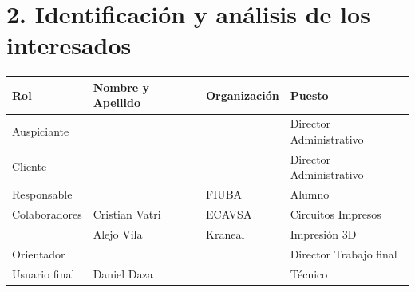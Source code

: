 \documentclass[
11pt, %
]{charter}
\begin{document}



\section{2. Identificación y análisis de los interesados}
\label{sec:interesados}


\begin{table}[ht]
\begin{tabularx}{\linewidth}{@{}|l|X|X|l|@{}}
\hline
\rowcolor[HTML]{C0C0C0} 
Rol           	& Nombre y Apellido & Organización 		& Puesto 					\\ \hline
Auspiciante   	& \clientename      & \empclientename  	& Director Administrativo    \\ \hline
Cliente       	& \clientename      & \empclientename	& Director Administrativo    \\ \hline
Responsable   	& \authorname       & FIUBA        		& Alumno 					\\ \hline
Colaboradores 	& Cristian Vatri    & ECAVSA   			& Circuitos Impresos			\\ \newline
				& Alejo Vila        & Kraneal 			& Impresión 3D  				\\ \hline
Orientador    	& \supname	        & \pertesupname 		& Director Trabajo final 	\\ \hline
Usuario final 	& Daniel Daza       & \empclientename	& Técnico 					\\ \hline
\end{tabularx}
\end{table}
\end{document}

